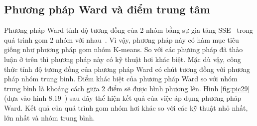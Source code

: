 \subsection{Phương pháp Ward và điểm trung tâm}
Phương pháp Ward tính độ tương đồng của 2 nhóm bằng sự gia tăng SSE~\cite{SSE} trong quá trình gom 2 nhóm với nhau~\cite{Vipin-Kumar, AHC, hierarchical-clustering}.
Vì vậy, phương pháp này có hàm mục tiêu giống như phương pháp gom nhóm K-means.
So với các phương pháp đã thảo luận ở trên thì phương pháp này có kỹ thuật hơi khác biệt.
Mặc dù vậy, công thức tính độ tương đồng của phương pháp Ward có chút tương đồng với phương pháp nhóm trung bình.
Điểm khác biệt của phương pháp Ward so với nhóm trung bình là khoảng cách giữa 2 điểm sẽ được bình phương lên.
Hình \ref{fig:pic29} (dựa vào hình 8.19~\cite{Vipin-Kumar}) sau đây thể hiện kết quả của việc áp dụng phương pháp Ward. Kết quả của quá trình gom nhóm hơi khác so với các kỹ thuật nhỏ nhất, lớn nhất và nhóm trung bình.


